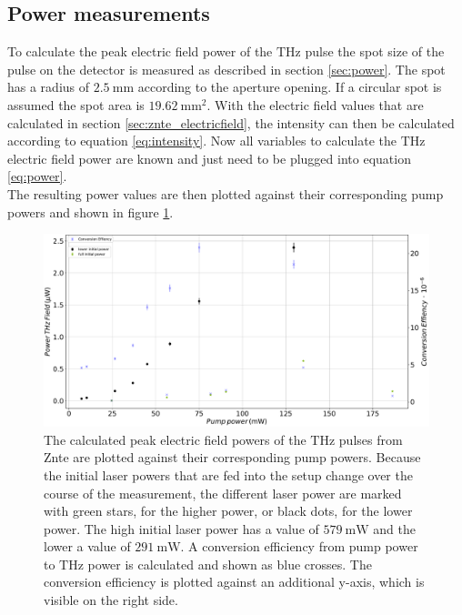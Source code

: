 \subsection{Power measurements}
\FloatBarrier
To calculate the peak electric field power of the $\si{\tera\hertz}$ pulse the spot size of the pulse on the detector is measured as described in section \ref{sec:power}.
The spot has a radius of $\SI{2.5}{\milli\meter}$ according to the aperture opening.
If a circular spot is assumed the spot area is $\SI{19.62}{\milli\meter\squared}$.
With the electric field values that are calculated in section \ref{sec:znte_electricfield}, the intensity can then be calculated according to equation \eqref{eq:intensity}.
Now all variables to calculate the $\si{\tera\hertz}$ electric field power are known and just need to be plugged into equation \eqref{eq:power}.
\\
The resulting power values are then plotted against their corresponding pump powers and shown in figure \ref{fig:znte_power}.
\begin{figure}
    \centering
    \includegraphics[width=\textwidth]{Plots/Powerznte.pdf}
    \caption{The calculated peak electric field powers of the $\si{\tera\hertz}$ pulses from Znte are plotted against their corresponding pump powers.
    Because the initial laser powers that are fed into the setup change over the course of the measurement, the different laser power are marked with green stars, for the higher power, or black dots, for the lower power.
    The high initial laser power has a value of $\SI{579}{\milli\W}$ and the lower a value of $\SI{291}{\milli\W}$.
    A conversion efficiency from pump power to $\si{\tera\hertz}$ power is calculated and shown as blue crosses. 
    The conversion efficiency is plotted against an additional y-axis, which is visible on the right side.}
    \label{fig:znte_power}
\end{figure}
